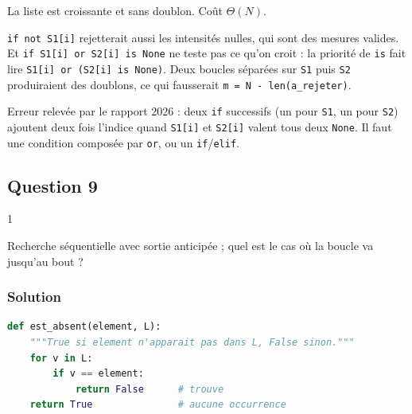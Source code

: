 \documentclass[11pt,a4paper]{article}
\begin{document}
La liste est croissante et sans doublon. Coût \(\Theta(N)\).

\begin{piege}

\texttt{if\ not\ S1{[}i{]}} rejetterait aussi les intensités nulles, qui sont des mesures valides. Et \texttt{if\ S1{[}i{]}\allowbreak{}\ or\ S2{[}i{]}\allowbreak{}\ is\ None} ne teste pas ce qu'on croit : la priorité de \texttt{is} fait lire \texttt{S1{[}i{]}\allowbreak{}\ or\ (\allowbreak{}S2{[}i{]}\allowbreak{}\ is\ None)\allowbreak{}}. Deux boucles séparées sur \texttt{S1} puis \texttt{S2} produiraient des doublons, ce qui fausserait \texttt{m\ =\allowbreak{}\ N\ -\ len(\allowbreak{}a\_rejeter)\allowbreak{}}.

\end{piege}

\begin{piege}

Erreur relevée par le rapport 2026 : deux \texttt{if} successifs (un pour \texttt{S1}, un pour \texttt{S2}) ajoutent deux fois l'indice quand \texttt{S1{[}i{]}} et \texttt{S2{[}i{]}} valent tous deux \texttt{None}. Il faut une condition composée par \texttt{or}, ou un \texttt{if}/\texttt{elif}.

\end{piege}

\hypertarget{question-9}{%
\subsection{Question 9}\label{question-9}}

\begin{indication}{1}

Recherche séquentielle avec sortie anticipée ; quel est le cas où la boucle va jusqu'au bout ?

\end{indication}

\hypertarget{solution-8}{%
\subsubsection{Solution}\label{solution-8}}

\begin{lstlisting}[language=Python]
def est_absent(element, L):
    """True si element n'apparait pas dans L, False sinon."""
    for v in L:
        if v == element:
            return False      # trouve
    return True               # aucune occurrence
\end{lstlisting}
\end{document}
